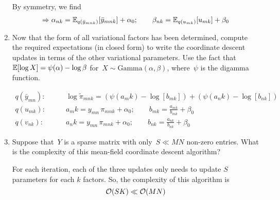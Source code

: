 \begin{enumerate}[label=(\alph*)]
\begin{solution}
By symmetry, we find
\begin{align*}
    \Rightarrow \alpha_{nk}
        = \mathbb{E}_{q(\bar{y}_{mnk})}[\bar{y}_{mnk}] + \alpha_0;
    \qquad \beta_{nk}
        = \mathbb{E}_{q(u_{mk})}[u_{mk}] + \beta_0
\end{align*}
\end{solution}

\item Now that the form of all variational factors has been determined, compute the required expectations (in closed form) to write the coordinate descent updates in terms of the other variational parameters.  Use the fact that~$\mathbb{E}[\log X] = \psi(\alpha) - \log \beta$ for~$X \sim \mathrm{Gamma}(\alpha, \beta)$, where~$\psi$ is the digamma function.

\begin{solution}
\begin{align*}
    q(\bar{y}_{mn}):
        &\qquad
            \log \tilde{\pi}_{mnk}
            = \left(\psi(a_mk) - \log[b_{mk}]\right) +
                \left(\psi(a_nk) - \log[b_{nk}]\right) \\
    q(u_{mk}):
        &\qquad
            a_mk   = y_{mn}\,\pi_{mnk} + \alpha_0;
        \qquad
            b_{mk}= \frac{a_{mk}}{b_{mk}} + \beta_0 \\
    q(v_{nk}):
        & \qquad
            a_nk   = y_{mn}\,\pi_{mnk} + \alpha_0;
        \qquad
            b_{nk}= \frac{a_{nk}}{b_{nk}} + \beta_0
\end{align*}

\end{solution}

\item Suppose that~$Y$ is a sparse matrix with only~$S \ll MN$ non-zero entries.  What is the complexity of this mean-field coordinate descent algorithm?

\begin{solution}
For each iteration, each of the three updates only needs to update $S$ parameters for each $k$ factors. So, the complexity of this algorithm is
$$\mathcal{O}(SK) \ll \mathcal{O}(MN)$$
\end{solution}

\end{enumerate}
